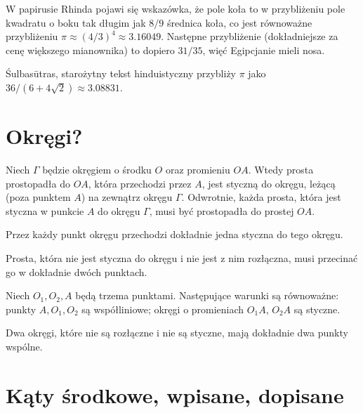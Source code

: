 W papirusie Rhinda pojawi się wskazówka, że pole koła to w przybliżeniu pole kwadratu o boku tak długim jak $8/9$ średnica koła, co jest równoważne przybliżeniu $\pi \approx (4/3)^4 \approx 3.16049$.
Następne przybliżenie (dokładniejsze za cenę większego mianownika) to dopiero $31/35$, więć Egipcjanie mieli nosa.

Śulbasūtras, starożytny tekst hinduistyczny przybliży $\pi$ jako $36 / (6 + 4 \sqrt 2) \approx 3.08831$.

\section{Okręgi?}
\begin{proposition}
    Niech $\Gamma$ będzie okręgiem o środku $O$ oraz promieniu $OA$.
    Wtedy prosta prostopadła do $OA$, która przechodzi przez $A$, jest styczną do okręgu, leżącą (poza punktem $A$) na zewnątrz okręgu $\Gamma$.
    Odwrotnie, każda prosta, która jest styczna w punkcie $A$ do okręgu $\Gamma$, musi być prostopadła do prostej $OA$.
\end{proposition} %

\begin{corollary}
    Przez każdy punkt okręgu przechodzi dokładnie jedna styczna do tego okręgu.
\end{corollary} %

\begin{corollary}
    Prosta, która nie jest styczna do okręgu i nie jest z nim rozłączna, musi przecinać go w dokładnie dwóch punktach.
\end{corollary} %

\begin{proposition}
    Niech $O_1, O_2, A$ będą trzema punktami.
    Następujące warunki są równoważne: punkty $A, O_1, O_2$ są współliniowe; okręgi o promieniach $O_1A$, $O_2A$ są styczne.
\end{proposition} %

\begin{corollary}
    Dwa okręgi, które nie są rozłączne i nie są styczne, mają dokładnie dwa punkty wspólne.
\end{corollary} %

\section{Kąty środkowe, wpisane, dopisane}


